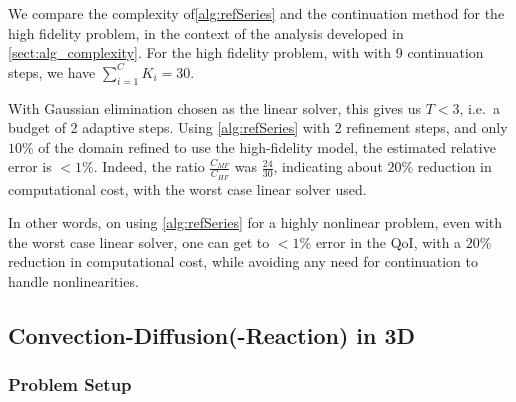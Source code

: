 {We compare the complexity of\cref{alg:refSeries} and the continuation method for the high fidelity problem, in the context of the analysis developed in \cref{sect:alg_complexity}. For the high fidelity problem, with  with 9 continuation steps, we have $\sum\limits_{i=1}^{C} K_i=30$. 
 
With Gaussian elimination chosen as the linear solver, this gives us $T < 3$, i.e.\ a budget of 2 adaptive steps. Using \cref{alg:refSeries} with 2 refinement steps, and only $10\%$ of the domain refined to use the high-fidelity model, the estimated relative error is $<1\%$. Indeed, the ratio $\frac{C_{MF}}{C_{HF}}$ was $\frac{24}{30}$, indicating about $20\%$ reduction in computational cost, with the worst case linear solver used. 

In other words, on using \cref{alg:refSeries} for a highly nonlinear problem, even with the worst case linear solver, one can get to $<1\%$ error in the QoI, with a $20\%$ reduction in computational cost, while avoiding any need for continuation to handle nonlinearities. }

\subsection{Convection-Diffusion(-Reaction) in 3D} \label{sec:cdvcdr3D}


\subsubsection{Problem Setup} \label{sec:setup3D}

